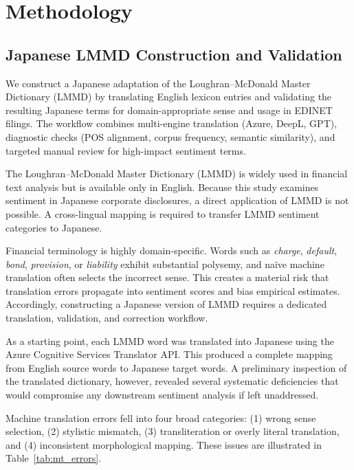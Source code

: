 \section{Methodology}
\label{sec:methodology}

\subsection{Japanese LMMD Construction and Validation}
\label{subsec:lmmd_construction_validation}
We construct a Japanese adaptation of the Loughran--McDonald Master Dictionary (LMMD) by translating English lexicon entries and validating the resulting Japanese terms for domain-appropriate sense and usage in EDINET filings. The workflow combines multi-engine translation (Azure, DeepL, GPT), diagnostic checks (POS alignment, corpus frequency, semantic similarity), and targeted manual review for high-impact sentiment terms.

The Loughran--McDonald Master Dictionary (LMMD) is widely used in financial text analysis but is available only in English. 
Because this study examines sentiment in Japanese corporate disclosures, a direct application of LMMD is not possible. 
A cross-lingual mapping is required to transfer LMMD sentiment categories to Japanese.

Financial terminology is highly domain-specific. 
Words such as \emph{charge}, \emph{default}, \emph{bond}, \emph{provision}, or \emph{liability} exhibit substantial polysemy, and naïve machine translation often selects the incorrect sense. 
This creates a material risk that translation errors propagate into sentiment scores and bias empirical estimates. 
Accordingly, constructing a Japanese version of LMMD requires a dedicated translation, validation, and correction workflow.

As a starting point, each LMMD word was translated into Japanese using the Azure Cognitive Services Translator API. 
This produced a complete mapping from English source words to Japanese target words. 
A preliminary inspection of the translated dictionary, however, revealed several systematic deficiencies that would compromise any downstream sentiment analysis if left unaddressed.

Machine translation errors fell into four broad categories: 
(1) wrong sense selection, 
(2) stylistic mismatch, 
(3) transliteration or overly literal translation, and 
(4) inconsistent morphological mapping. 
These issues are illustrated in Table~\ref{tab:mt_errors}.

